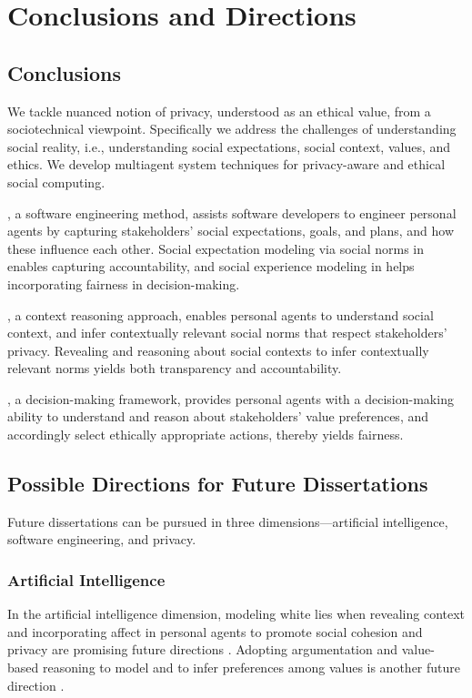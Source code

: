 \chapter{Conclusions and Directions}
\label{chap:conclusions}

\section{Conclusions}

We tackle nuanced notion of privacy, understood as an ethical value, from a sociotechnical viewpoint. 
Specifically we address the challenges of understanding social reality, i.e., understanding social expectations, social context, values, and ethics.
We develop multiagent system techniques for privacy-aware and ethical social computing.  

\frameworkA, a software engineering method, assists software developers to engineer personal agents by capturing stakeholders' social expectations, goals, and plans, and how these influence each other.  
Social expectation modeling via social norms in \frameworkA enables capturing accountability,
and social experience modeling in \frameworkA helps incorporating fairness in decision-making.

\frameworkB, a context reasoning approach, enables personal agents to understand social context, and infer contextually relevant social norms that respect stakeholders' privacy. 
Revealing and reasoning about social contexts to infer contextually relevant norms yields both transparency and accountability.

\frameworkAinur, a decision-making framework, provides personal agents with a decision-making ability to understand and reason about stakeholders' value preferences, 
and accordingly select ethically appropriate actions, thereby yields fairness.  

\section{Possible Directions for Future Dissertations}
Future dissertations can be pursued in three dimensions---artificial intelligence, software engineering, and privacy.

\subsection{Artificial Intelligence}
In the artificial intelligence dimension, modeling white lies when revealing context and incorporating affect in personal agents to promote social cohesion and privacy are promising future directions \citep{IJCAI-18:Poros,Kalia+14:Emotions}.
Adopting argumentation and value-based reasoning to model and to infer preferences among values is another future direction \citep{Ajmeri-IJCAI16-Coco,Ajmeri-Computer17-Aragorn}.

